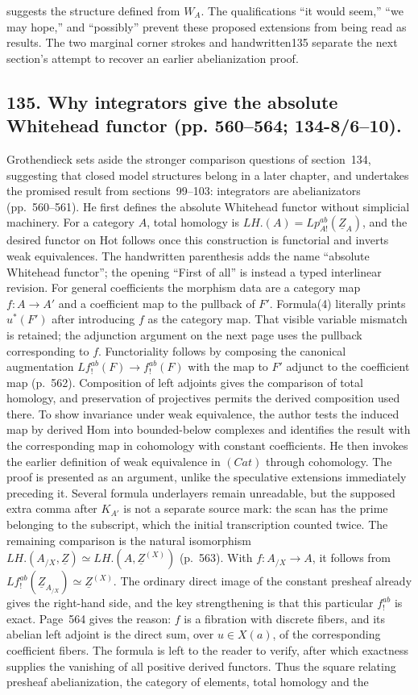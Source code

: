 \documentclass[10pt,oneside]{book}
\begin{document}
suggests the structure defined from $W_A$. The qualifications ``it would seem,'' ``we may hope,'' and ``possibly'' prevent these proposed extensions from being read as results. The two marginal corner strokes and handwritten135 separate the next section's attempt to recover an earlier abelianization proof.

\subsection*{135. Why integrators give the absolute Whitehead functor (pp. 560--564; 134-8/6--10).}
Grothendieck sets aside the stronger comparison questions of section~134, suggesting that closed model structures belong in a later chapter, and undertakes the promised result from sections~99--103: integrators are abelianizators (pp.~560--561). He first defines the absolute Whitehead functor without simplicial machinery. For a category $A$, total homology is $LH.(A)=Lp^{ab}_{A!}(\underline Z_A)$, and the desired functor on $\mathrm{Hot}$ follows once this construction is functorial and inverts weak equivalences. The handwritten parenthesis adds the name ``absolute Whitehead functor''; the opening ``First of all'' is instead a typed interlinear revision. For general coefficients the morphism data are a category map $f:A\to A'$ and a coefficient map to the pullback of $F'$. Formula(4) literally prints $u^*(F')$ after introducing $f$ as the category map. That visible variable mismatch is retained; the adjunction argument on the next page uses the pullback corresponding to $f$. Functoriality follows by composing the canonical augmentation $Lf^{ab}_{!}(F)\to f^{ab}_{!}(F)$ with the map to $F'$ adjunct to the coefficient map (p.~562). Composition of left adjoints gives the comparison of total homology, and preservation of projectives permits the derived composition used there. To show invariance under weak equivalence, the author tests the induced map by derived Hom into bounded-below complexes and identifies the result with the corresponding map in cohomology with constant coefficients. He then invokes the earlier definition of weak equivalence in $(Cat)$ through cohomology. The proof is presented as an argument, unlike the speculative extensions immediately preceding it. Several formula underlayers remain unreadable, but the supposed extra comma after $K_{A'}$ is not a separate source mark: the scan has the prime belonging to the subscript, which the initial transcription counted twice. The remaining comparison is the natural isomorphism $LH.(A_{/X},\underline Z)\simeq LH.(A,\underline Z^{(X)})$ (p.~563). With $f:A_{/X}\to A$, it follows from $Lf^{ab}_{!}(\underline Z_{A_{/X}})\simeq\underline Z^{(X)}$. The ordinary direct image of the constant presheaf already gives the right-hand side, and the key strengthening is that this particular $f^{ab}_{!}$ is exact. Page~564 gives the reason: $f$ is a fibration with discrete fibers, and its abelian left adjoint is the direct sum, over $u\in X(a)$, of the corresponding coefficient fibers. The formula is left to the reader to verify, after which exactness supplies the vanishing of all positive derived functors. Thus the square relating presheaf abelianization, the category of elements, total homology and the 
\end{document}
